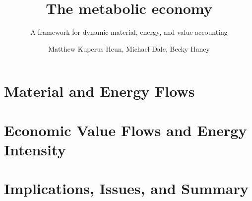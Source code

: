 \documentclass[graybox,envcountchap,sectrefs]{svmono}
\begin{document}
\author{Matthew Kuperus Heun, Michael Dale, Becky Haney}
\title{The metabolic economy}
\subtitle{A framework for dynamic material, energy, and value accounting}
\maketitle{}

\frontmatter%

%
%
%
%

\tableofcontents{}
\listoffigures{}
\listoftables{}
\printnomenclature{}   %

%


\mainmatter%



\part{Material and Energy Flows}







\part{Economic Value Flows and Energy Intensity}

 

 

\part{Implications, Issues, and Summary}







\appendix










\backmatter%
%
%
\printindex{}

\end{document}
